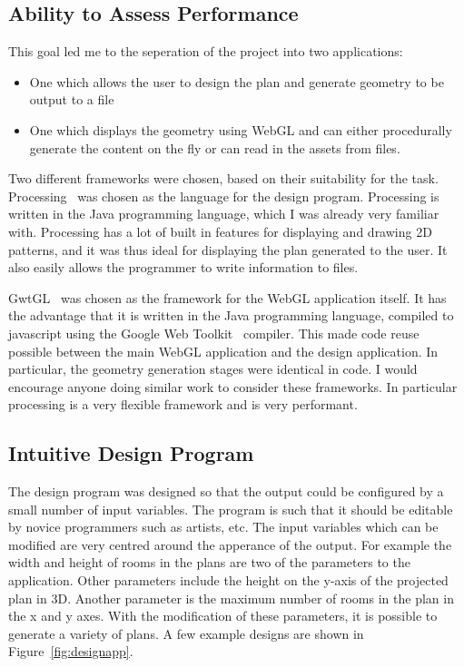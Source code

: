\subsection{Ability to Assess Performance}
This goal led me to the seperation of the project into two applications:
\begin{itemize}
	\item One which allows the user to design the plan and generate geometry to be output to a file
	\item One which displays the geometry using WebGL and can either procedurally generate the content on the fly or can read in the assets from files.
\end{itemize}

Two different frameworks were chosen, based on their suitability for the task.
Processing~\cite{web:processing} was chosen as the language for the design program.
Processing is written in the Java programming language, which I was already very familiar with.
Processing has a lot of built in features for displaying and drawing 2D patterns, and it was thus ideal for displaying the plan generated to the user.
It also easily allows the programmer to write information to files.

GwtGL~\cite{web:gwtgl} was chosen as the framework for the WebGL application itself.
It has the advantage that it is written in the Java programming language, compiled to javascript using the Google Web Toolkit~\cite{web:gwt} compiler.
This made code reuse possible between the main WebGL application and the design application.
In particular, the geometry generation stages were identical in code.
I would encourage anyone doing similar work to consider these frameworks.
In particular processing is a very flexible framework and is very performant.

\subsection{Intuitive Design Program}
The design program was designed so that the output could be configured by a small number of input variables.
The program is such that it should be editable by novice programmers such as artists, etc.
The input variables which can be modified are very centred around the apperance of the output.
For example the width and height of rooms in the plans are two of the parameters to the application.
Other parameters include the height on the y-axis of the projected plan in 3D.
Another parameter is the maximum number of rooms in the plan in the x and y axes.
With the modification of these parameters, it is possible to generate a variety of plans.
A few example designs are shown in Figure~\ref{fig:designapp}.

